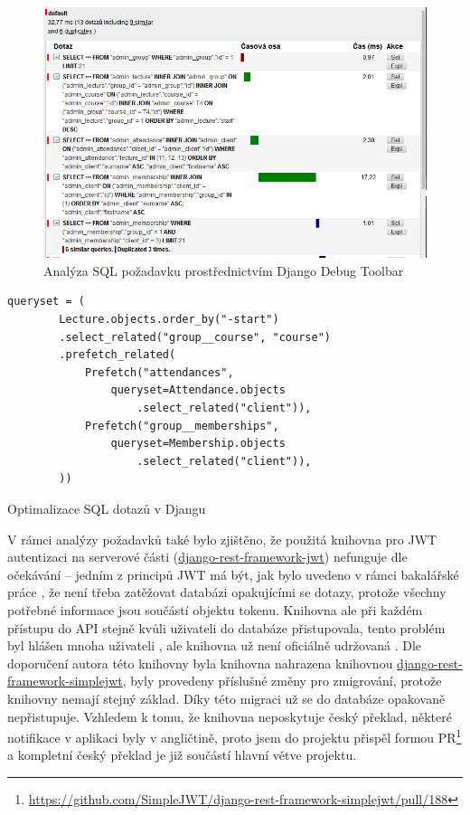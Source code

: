 \begin{figure}[h]\centering
    \includegraphics[width=1\textwidth]{img/ddt.png}
    \caption{Analýza SQL požadavku prostřednictvím Django Debug Toolbar}\label{fig:ddt}
\end{figure}

\begin{listing}[ht]
	\begin{verbatim}
queryset = (
        Lecture.objects.order_by("-start")
        .select_related("group__course", "course")
        .prefetch_related(
            Prefetch("attendances",
                queryset=Attendance.objects
                    .select_related("client")),
            Prefetch("group__memberships",
                queryset=Membership.objects
                    .select_related("client")),
        ))
	\end{verbatim}
	\caption{Optimalizace SQL dotazů v Djangu}\label{lst:optimalizace-django}
\end{listing}

V rámci analýzy požadavků také bylo zjištěno, že použitá knihovna pro JWT autentizaci na serverové části (\href{https://github.com/jpadilla/django-rest-framework-jwt}{django-rest-framework-jwt}) nefunguje dle očekávání -- jedním z principů JWT má být, jak bylo uvedeno v rámci bakalářské práce \cite{bp}, že není třeba zatěžovat databázi opakujícími se dotazy, protože všechny potřebné informace jsou součástí objektu tokenu. Knihovna ale při každém přístupu do API stejně kvůli uživateli do databáze přistupovala, tento problém byl hlášen mnoha uživateli \cite{django-rest-framework-jwt-issue}, ale knihovna už není oficiálně udržovaná \cite{django-rest-framework-jwt}. Dle doporučení autora této knihovny byla knihovna nahrazena knihovnou \href{https://github.com/SimpleJWT/django-rest-framework-simplejwt}{django-rest-framework-simplejwt}, byly provedeny příslušné změny pro zmigrování, protože knihovny nemají stejný základ. Díky této migraci už se do databáze opakovaně nepřistupuje. Vzhledem k tomu, že knihovna neposkytuje český překlad, některé notifikace v aplikaci byly v angličtině, proto jsem do projektu přispěl formou PR\footnote{\url{https://github.com/SimpleJWT/django-rest-framework-simplejwt/pull/188}} a kompletní český překlad je již součástí hlavní větve projektu.

